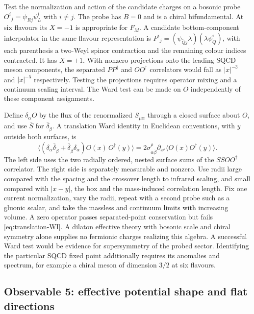 \documentclass[11pt,a4paper]{article}
\theoremstyle{plain}
\theoremstyle{definition}
\theoremstyle{remark}
\begin{document}
Test the normalization and action of the candidate charges on a
bosonic probe $O^i{}_j=\bar\psi_{Rj}\psi_L^i$ with $i\ne j$.
The probe has $B=0$ and is a chiral bifundamental. At six flavours
its $X=-1$ is appropriate for $F_M$. A candidate bottom-component
interpolator in the same flavour representation is
$P^i{}_j=(\psi_{\widetilde Q j}\lambda)(\lambda\psi_Q^i)$,
with each parenthesis a two-Weyl spinor contraction and the remaining
colour indices contracted. It has $X=+1$. With nonzero projections
onto the leading SQCD meson components, the separated $P P^\dagger$
and $O O^\dagger$ correlators would fall as $|x|^{-3}$ and
$|x|^{-5}$ respectively. Testing the projections requires operator
mixing and a continuum scaling interval. The Ward test can be made
on $O$ independently of these component assignments.

Define
$\delta_\alpha O$ by the flux of the renormalized $S_{\mu\alpha}$
through a closed surface about $O$, and use $\bar S$ for
$\bar\delta_{\dot\beta}$. A translation Ward identity in Euclidean
conventions, with $y$ outside both surfaces, is
\begin{equation}\label{eq:translation-WI}
 \big\langle(\delta_\alpha\bar\delta_{\dot\beta}
      +\bar\delta_{\dot\beta}\delta_\alpha)O(x)\,O^\dagger(y)\big\rangle
 =2\sigma^\rho_{\alpha\dot\beta}\partial_{x^\rho}
        \langle O(x)O^\dagger(y)\rangle .
\end{equation}
The left side uses the two radially ordered, nested surface sums of the
$S\bar S O O^\dagger$ correlator. The right side is separately
measurable and nonzero. Use radii large compared with the spacing
and the crossover length to infrared scaling, and small compared with
$|x-y|$, the box and the mass-induced correlation length. Fix one
current normalization, vary the radii, repeat with a second probe
such as a gluonic scalar, and take the massless and continuum
limits with increasing volume. A zero operator passes separated-point
conservation but fails \cref{eq:translation-WI}. A dilaton effective
theory with bosonic scale and chiral symmetry alone supplies no
fermionic charges realizing this algebra. A successful Ward test
would be evidence for supersymmetry of the probed sector. Identifying
the particular SQCD fixed point additionally requires its anomalies
and spectrum, for example a chiral meson of dimension $3/2$ at six
flavours.

\subsection{Observable 5: effective potential shape and flat directions}
\label{ssec:obs5}
\end{document}
